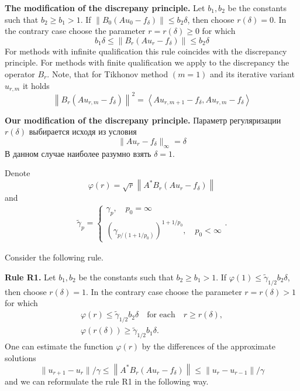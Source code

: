 \documentclass[10pt]{article}
\theoremstyle{definition}
\theoremstyle{remark}
\theoremstyle{plain}
\newcommand{\scalar}[2]{\left<#1,#2\right>}
\begin{document}
\textbf{The modification of the discrepany principle.} 
Let $b_1,b_2$ be the constants such that $b_2\geqslant b_1 > 1$. If $\left\|B_0(Au_0 - f_\delta)\right\|\leqslant b_2\delta$, then choose $r(\delta)=0$. In the contrary case choose the parameter $r = r(\delta)\geqslant 0$ for which 
$$
b_1\delta \leqslant \left\|B_r( Au_r - f_\delta) \right\| \leqslant b_2\delta
$$
For methods with infinite qualification this rule coincides with the discrepancy principle.
For methods with finite qualification we apply to the discrepancy the operator $B_r$.
Note, that for Tikhonov method $(m = 1)$ and its iterative variant $u_{r,m}$ it holds
$$
\left\|
	B_r(Au_{r,m} - f_\delta)
\right\|^2 
= 
\scalar
	{Au_{r,m+1} - f_\delta}
	{Au_{r,m} - f_\delta}
$$

\textbf{Our modification of the discrepany principle.}
Параметр регуляризации $r(\delta)$ выбирается исходя из условия
$$
\|Au_r - f_\delta \|_{\infty}  = \delta
$$
В данном случае наиболее разумно взять $\delta = 1$.

Denote 
$$
\varphi(r) = \sqrt{r}\left\|A^*B_r(Au_r - f_\delta)\right\|
$$ 
and 
\begin{align*}
\tilde{\gamma}_p =
\left\{
	\begin{aligned}
	\gamma_p , \quad p_0 = \infty \\
	\left( \gamma_{p/(1 + 1/p_0)} \right) ^{1 + 1/p_0}, \quad p_0 < \infty
	\end{aligned}
\right.
.
\end{align*}

Consider the following
rule.

\textbf{Rule R1.}
Let $b_1,b_2$ be the constants such that $b_2\geqslant b_1 > 1$. If $\varphi(1)\leqslant \tilde{\gamma}_{1/2}b_2\delta$, then choose $r(\delta) = 1$. In the contrary case choose the parameter $r = r(\delta) >1$ for which 
\begin{gather*}
\varphi(r)\leqslant \tilde{\gamma}_{1/2} b_2\delta \quad \text{for each}\quad  r\geqslant r(\delta), \\
\varphi(r(\delta))\geqslant \tilde{\gamma}_{1/2} b_1\delta.
\end{gather*}
One can estimate the function $\varphi(r)$ by the differences of the approximate solutions
$$
\| u_{r+1} - u_r \| /\gamma 
\leqslant
\left\|
	A^*B_r(Au_r - f_\delta)
\right\|
\leqslant
\| u_{r} - u_{r-1} \| /\gamma 
$$
and we can reformulate the rule R1 in the following way.
\end{document}

